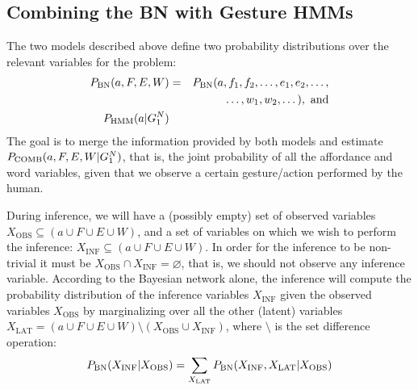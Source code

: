 
\newcommand{\pcomb}{\ensuremath P_{\text{COMB}}}

\subsection{Combining the \acs{BN} with Gesture \acsp{HMM}}
\label{sec:combination}
The two models described above define two probability distributions over the relevant variables for the problem:
\begin{eqnarray*}
  P_{\text{BN}}(a, F, E, W) &=& P_{\text{BN}}(a, f_1, f_2, \dots, e_1, e_2, \dots,\\
  && \hspace{1cm} \dots, w_1, w_2, \dots), \text{ and} \\
  P_{\text{HMM}}(a|G_1^N) &&
\end{eqnarray*}
The goal is to merge the information provided by both models and estimate $\pcomb(a, F, E, W|G_1^N)$, that is, the joint probability of all the affordance and word variables, given that we observe a certain gesture/action performed by the human.

During inference, we will have a (possibly empty) set of observed variables $X_\text{OBS} \subseteq (a \cup F \cup E \cup W)$, and a set of variables on which we wish to perform the inference: $X_\text{INF} \subseteq (a \cup F \cup E \cup W)$.
In order for the inference to be non-trivial it must be $X_\text{OBS} \cap X_\text{INF} = \varnothing$, that is, we should not observe any inference variable.
According to the Bayesian network alone, the inference will compute the probability distribution of the inference variables $X_\text{INF}$ given the observed variables $X_\text{OBS}$ by marginalizing over all the other (latent) variables $X_\text{LAT} = (a \cup F \cup E \cup W) \setminus (X_\text{OBS} \cup X_\text{INF})$, where $\setminus$ is the set difference operation:
\begin{eqnarray*}
 P_{\text{BN}}(X_\text{INF}|X_\text{OBS}) = \sum_{X_\text{LAT}} P_{\text{BN}}(X_\text{INF}, X_\text{LAT}| X_\text{OBS})
\end{eqnarray*}

